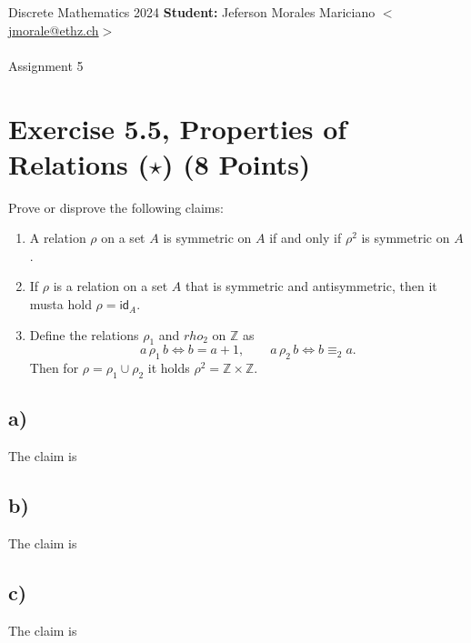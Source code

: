 \documentclass[unicode,11pt,a4paper,oneside,numbers=endperiod,openany]{scrartcl}
\begin{document}
\setassignment
{}

\serieheader
{Discrete Mathematics}
{2024}
{%
\textbf{Student:} Jeferson Morales Mariciano 
\href{mailto:jmorale@ethz.ch}{\(<\)jmorale@ethz.ch\(>\)} \\\\}
{\vspace{-1cm}}%
{Assignment 5}{}

\section*{Exercise 5.5, Properties of Relations (\(\star\)) \hfill (8 Points)}

Prove or disprove the following claims:

\begin{enumerate}[label=\textbf{\alph*)}]
    \item A relation \( \rho \) on a set \( A \) is symmetric on \( A \) 
        if and only if \( \rho^2 \) is symmetric on \( A \).

    \item If \( \rho \) is a relation on a set \( A \) 
        that is symmetric and antisymmetric,
        then it musta hold \( \rho = \textsf{id}_A \).

    \item Define the relations \( \rho_1 \) and \( rho_2 \) on \( \mathbb{Z} \) as
    \[
        a \, \rho_1 \, b \iff b = a + 1, \qquad a \, \rho_2 \, b \iff b \equiv_2 a.
    \]
    Then for \( \rho = \rho_1 \cup \rho_2 \) it holds \( \rho^2 = \mathbb{Z} \times \mathbb{Z} \).
\end{enumerate}


\subsection*{a)}

The claim is 

\subsection*{b)}

The claim is 

\subsection*{c)}

The claim is 
\end{document}
